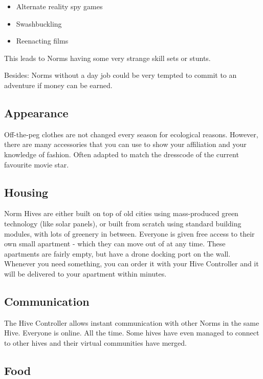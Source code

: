 \begin{itemize}
    \item Alternate reality spy games
    \item Swashbuckling
    \item Reenacting films
\end{itemize}

This leads to Norms having some very strange skill sets or stunts.

Besides: Norms without a day job could be very tempted to commit to an adventure if money can be earned.

\subsection{Appearance}

Off-the-peg clothes are not changed every season for ecological reasons. However, there are many accessories that you can use to show your affiliation and your knowledge of fashion. Often adapted to match the dresscode of the current favourite movie star.

\subsection{Housing}

Norm Hives are either built on top of old cities using mass-produced green technology (like solar panels), or built from scratch using standard building modules, with lots of greenery in between.
Everyone is given free access to their own small apartment - which they can move out of at any time. These apartments are fairly empty, but have a drone docking port on the wall. Whenever you need something, you can order it with your Hive Controller and it will be delivered to your apartment within minutes.

\subsection{Communication}

The Hive Controller allows instant communication with other Norms in the same Hive. Everyone is online. All the time. Some hives have even managed to connect to other hives and their virtual communities have merged.

\subsection{Food}
\label{sec: norm food}

